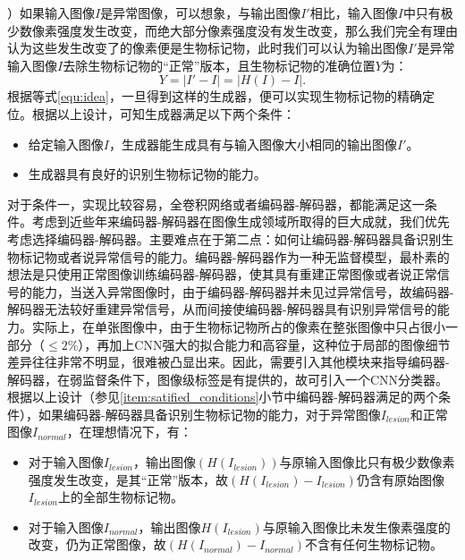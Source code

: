 ）如果输入图像$I$是异常图像，可以想象，与输出图像$I'$相比，输入图像$I$中只有极少数像素强度发生改变，而绝大部分像素强度没有发生改变，那么我们完全有理由认为这些发生改变了的像素便是生物标记物，此时我们可以认为输出图像$I'$是异常输入图像$I$去除生物标记物的“正常”版本，且生物标记物的准确位置$Y$为：
\begin{equation}\label{equ:idea}
Y=|I'-I|=|H(I) - I|.
\end{equation}
\noindent 根据等式\ref{equ:idea}，一旦得到这样的生成器，便可以实现生物标记物的精确定位。根据以上设计，可知生成器满足以下两个条件：
\begin{itemize}\label{item:satified_conditions}
	\item 给定输入图像$I$，生成器能生成具有与输入图像大小相同的输出图像$I'$。 
	\item 生成器具有良好的识别生物标记物的能力。
\end{itemize}
\noindent 对于条件一，实现比较容易，全卷积网络或者编码器-解码器，都能满足这一条件。考虑到近些年来编码器-解码器在图像生成领域所取得的巨大成就，我们优先考虑选择编码器-解码器。主要难点在于第二点：如何让编码器-解码器具备识别生物标记物或者说异常信号的能力。编码器-解码器作为一种无监督模型，最朴素的想法是只使用正常图像训练编码器-解码器，使其具有重建正常图像或者说正常信号的能力，当送入异常图像时，由于编码器-解码器并未见过异常信号，故编码器-解码器无法较好重建异常信号，从而间接使编码器-解码器具有识别异常信号的能力。实际上，在单张图像中，由于生物标记物所占的像素在整张图像中只占很小一部分（$\le 2\%$），再加上CNN强大的拟合能力和高容量，这种位于局部的图像细节差异往往非常不明显，很难被凸显出来。因此，需要引入其他模块来指导编码器-解码器，在弱监督条件下，图像级标签是有提供的，故可引入一个CNN分类器。根据以上设计（参见\ref{item:satified_conditions}小节中编码器-解码器满足的两个条件），如果编码器-解码器具备识别生物标记物的能力，对于异常图像$I_{lesion}$和正常图像$I_{normal}$，在理想情况下，有：
\begin{itemize}\label{ite:ideal_situation}
	\item 对于输入图像$I_{lesion}$，输出图像$({H}(I_{lesion}))$与原输入图像比只有极少数像素强度发生改变，是其“正常”版本，故$({H}(I_{lesion})-I_{lesion})$仍含有原始图像$I_{lesion}$上的全部生物标记物。 
	\item 对于输入图像$I_{normal}$，输出图像${H}(I_{lesion})$与原输入图像比未发生像素强度的改变，仍为正常图像，故$({H}(I_{normal})-I_{normal})$不含有任何生物标记物。
\end{itemize}
